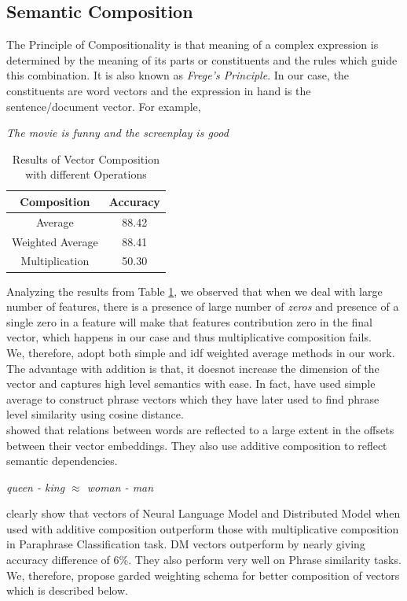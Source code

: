 \documentclass[11pt,a4paper]{article}
\begin{document}
\subsection{Semantic Composition}
\label{sec:composition}
The Principle of Compositionality is that meaning of a complex expression is determined by the meaning of its parts or constituents and the rules which guide this combination. It is also known as \emph{Frege's Principle}. In our case, the constituents are word vectors and the expression in hand is the sentence/document vector. For example,
\begin{center}
\emph{The movie is funny and the screenplay is good}
\end{center}

\begin {table}[H]
\centering
\begin{tabular}{ |c|c| }
\hline
Composition & Accuracy \\ \hline \hline
Average & 88.42 \\ \hline
Weighted Average & 88.41 \\ \hline
Multiplication & 50.30 \\ \hline
\end{tabular}
\caption {Results of Vector Composition with different Operations}
\label{table:composition}
\end{table}
Analyzing the results from Table \ref{table:composition}, we observed that when we deal with large number of features, there is a presence of large number of \emph{zeros} and presence of a single zero in a feature will make that features contribution zero in the final vector, which happens in our case and thus multiplicative composition fails.\\
We, therefore, adopt both simple and idf weighted average methods in our work. The advantage with addition is that, it doesnot increase the dimension of the vector and captures high level semantics with ease. In fact, \cite{Zou:13} have used simple average to construct phrase vectors which they have later used to find phrase level similarity using cosine distance.\\
\cite{Mikolov:13c} showed that relations between words are reflected to a large extent in the offsets between their vector embeddings. They also use additive composition to reflect semantic dependencies.
\begin{center}
\emph{queen - king $\approx$ woman - man}
\end{center}
\cite{Blacoe:12} clearly show that vectors of Neural Language Model and Distributed Model when used with additive composition outperform those with multiplicative composition in Paraphrase Classification task. DM vectors outperform by nearly giving accuracy difference of 6\%. They also perform very well on Phrase similarity tasks.\\
We, therefore, propose garded weighting schema for better composition of vectors which is described below.
\end{document}
